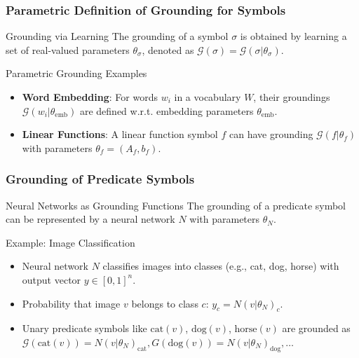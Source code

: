 \documentclass{beamer}
\newcommand{\G}{\mathcal{G}}
\begin{document}
\begin{frame}
\frametitle{Parametric Definition of Grounding for Symbols}
\begin{block}{Grounding via Learning}
The grounding of a symbol \( \sigma \) is obtained by learning a set of real-valued parameters \( \theta_\sigma \), denoted as \( \G(\sigma) = \G(\sigma | \theta_\sigma) \).
\end{block}

\begin{block}{Parametric Grounding Examples}
\begin{itemize}
    \item \textbf{Word Embedding}: For words \( w_i \) in a vocabulary \( W \), their groundings \( \G(w_i | \theta_{\text{emb}}) \) are defined w.r.t. embedding parameters \( \theta_{\text{emb}} \).
    \item \textbf{Linear Functions}: A linear function symbol \( f \) can have grounding \( \G(f | \theta_f) \) with parameters \( \theta_f = (A_f, b_f) \).
\end{itemize}
\end{block}
\end{frame}

\begin{frame}
\frametitle{Grounding of Predicate Symbols}
\begin{block}{Neural Networks as Grounding Functions}
The grounding of a predicate symbol can be represented by a neural network \( N \) with parameters \( \theta_N \).
\end{block}

\begin{block}{Example: Image Classification}
\begin{itemize}
    \item Neural network \( N \) classifies images into classes (e.g., cat, dog, horse) with output vector \( y \in [0, 1]^n \).
    \item Probability that image \( v \) belongs to class \( c \): \( y_c = N(v | \theta_N)_c \).
    \item Unary predicate symbols like \( \text{cat}(v) \), \( \text{dog}(v) \), \( \text{horse}(v) \) are grounded as \( \G(\text{cat}(v)) = N(v | \theta_N)_{\text{cat}}, G(\text{dog}(v)) = N(v | \theta_N)_{\text{dog}}, \ldots \)
\end{itemize}
\end{block}
\end{frame}
\end{document}
